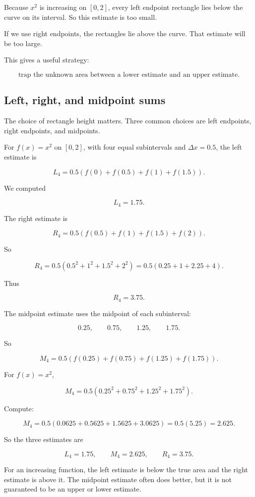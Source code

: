 Because \(x^2\) is increasing on \([0,2]\), every left endpoint rectangle lies below the
curve on its interval.  So this estimate is too small.

If we use right endpoints, the rectangles lie above the curve.  That estimate will be
too large.

This gives a useful strategy:

\[
\text{trap the unknown area between a lower estimate and an upper estimate.}
\]

\subsection{Left, right, and midpoint sums}
\label{subsec:left-right-midpoint-sums}

The choice of rectangle height matters.  Three common choices are left endpoints,
right endpoints, and midpoints.

For \(f(x)=x^2\) on \([0,2]\), with four equal subintervals and \(\Delta x=0.5\), the
left estimate is

\[
L_4
=
0.5\left(f(0)+f(0.5)+f(1)+f(1.5)\right).
\]

We computed

\[
L_4=1.75.
\]

The right estimate is

\[
R_4
=
0.5\left(f(0.5)+f(1)+f(1.5)+f(2)\right).
\]

So

\[
R_4
=
0.5\left(0.5^2+1^2+1.5^2+2^2\right)
=
0.5(0.25+1+2.25+4).
\]

Thus

\[
R_4=3.75.
\]

The midpoint estimate uses the midpoint of each subinterval:

\[
0.25,\qquad 0.75,\qquad 1.25,\qquad 1.75.
\]

So

\[
M_4
=
0.5\left(f(0.25)+f(0.75)+f(1.25)+f(1.75)\right).
\]

For \(f(x)=x^2\),

\[
M_4
=
0.5\left(0.25^2+0.75^2+1.25^2+1.75^2\right).
\]

Compute:

\[
M_4
=
0.5(0.0625+0.5625+1.5625+3.0625)
=
0.5(5.25)
=
2.625.
\]

So the three estimates are

\[
\boxed{
L_4=1.75,\qquad M_4=2.625,\qquad R_4=3.75.
}
\]

For an increasing function, the left estimate is below the true area and the right
estimate is above it.  The midpoint estimate often does better, but it is not guaranteed
to be an upper or lower estimate.


